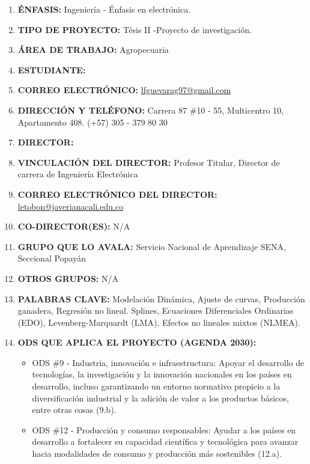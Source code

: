 {    %
      \titulovar \vspace{0.5cm}
    \begin{enumerate}
        \item {\bf ÉNFASIS:} Ingeniería  -  Énfasis en electrónica.
        \item {\bf TIPO DE PROYECTO:} Tésis II -Proyecto de investigación.
        \item {\bf ÁREA DE TRABAJO:} Agropecuaria
        \item {\bf ESTUDIANTE:} \authorA
        \item {\bf CORREO ELECTRÓNICO:} \href{mailto:lfguevarag97@gmail.com}{lfguevarag97@gmail.com}
        \item {\bf DIRECCIÓN Y TELÉFONO:} Carrera 87 \#10 - 55, Multicentro 10, Apartamento 408. (+57) 305 -  379 80 30
        \item {\bf DIRECTOR:} \director
        \item {\bf VINCULACIÓN DEL DIRECTOR:} Profesor Titular, Director de carrera de Ingeniería Electrónica
        \item {\bf CORREO ELECTRÓNICO DEL DIRECTOR:}  \href{mailto:letobon@javerianacali.edu.co}{letobon@javerianacali.edu.co}
        \item {\bf CO-DIRECTOR(ES):} N/A
        \item {\bf GRUPO QUE LO AVALA:}  Servicio Nacional de Aprendizaje SENA, Seccional Popayán
        \item {\bf OTROS GRUPOS:} N/A
        \item {\bf PALABRAS CLAVE:} Modelación Dinámica, Ajuste de curvas, Producción ganadera, Regresión no lineal. Splines, Ecuaciones Diferenciales Ordinarias (EDO), Levenberg-Marquardt (LMA), Efectos no lineales mixtos (NLMEA).
        \pagebreak
        \item {\bf ODS QUE APLICA EL PROYECTO (AGENDA 2030):}
        \begin{itemize}
            \item ODS \#9 - Industria, innovación e infraestructura: Apoyar el desarrollo de tecnologías, la investigación y la innovación nacionales en los países en desarrollo, incluso garantizando un entorno normativo propicio a la diversificación industrial y la adición de valor a los productos básicos, entre otras cosas (9.b).
            \item ODS \#12 - Producción y consumo responsables: Ayudar a los países en desarrollo a fortalecer su capacidad científica y tecnológica para avanzar hacia modalidades de consumo y producción más sostenibles (12.a).
        \end{itemize}


\end{enumerate}}
